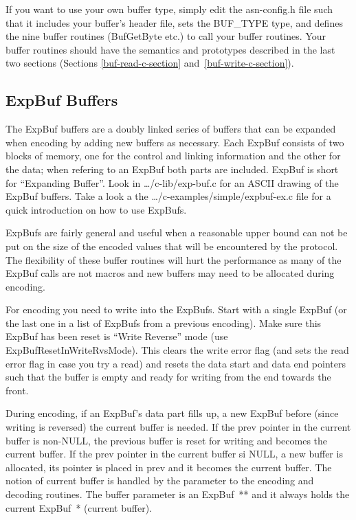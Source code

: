 If you want to use your own buffer type, simply edit the
{\ufn asn-config.h} file such that it includes your buffer's header
file, sets the {\C BUF\_TYPE} type, and defines the nine buffer
routines ({\C BufGetByte} etc.) to call your buffer routines.  Your
buffer routines should have the semantics and prototypes described in
the last two sections (Sections \ref{buf-read-c-section} and~\ref{buf-write-c-section}).

\subsection{ExpBuf Buffers}

The {\C ExpBuf} buffers are a doubly linked series of buffers that
can be expanded when encoding by adding new buffers as necessary.
Each {\C ExpBuf} consists of two blocks of memory, one for the
control and linking information and the other for the data; when
refering to an {\C ExpBuf} both parts are included. {\C ExpBuf} is
short for ``Expanding Buffer''.  Look in {\ufn \dots/c-lib/exp-buf.c}
for an ASCII drawing of the {\C ExpBuf} buffers. Take a look a the
{\ufn \dots/c-examples/simple/expbuf-ex.c} file for a quick
introduction on how to use {\C ExpBufs}.

{\C ExpBufs} are fairly general and useful when a reasonable upper
bound can not be put on the size of the encoded values that will be
encountered by the protocol.  The flexibility of these buffer routines
will hurt the performance as many of the {\C ExpBuf} calls are not
macros and new buffers may need to be allocated during encoding.

For encoding you need to write into the {\C ExpBufs}. Start with a
single ExpBuf (or the last one in a list of ExpBufs from a previous
encoding).  Make sure this ExpBuf has been reset is ``Write Reverse''
mode (use {\C ExpBufResetInWriteRvsMode}).  This clears the write
error flag (and sets the read error flag in case you try a read) and
resets the data start and data end pointers such that the buffer is
empty and ready for writing from the end towards the front.

During encoding, if an {\C ExpBuf}'s data part fills up, a new
{\C ExpBuf} before (since writing is reversed) the current buffer is
needed.  If the {\C prev} pointer in the current buffer is non-NULL,
the previous buffer is reset for writing and becomes the current
buffer.  If the {\C prev} pointer in the current buffer si NULL, a new
buffer is allocated, its pointer is placed in {\C prev} and it
becomes the current buffer.  The notion of current buffer is handled
by the parameter to the encoding and decoding routines.  The buffer
parameter is an {\C ExpBuf~**} and it always holds the current
{\C ExpBuf~*} (current buffer).

